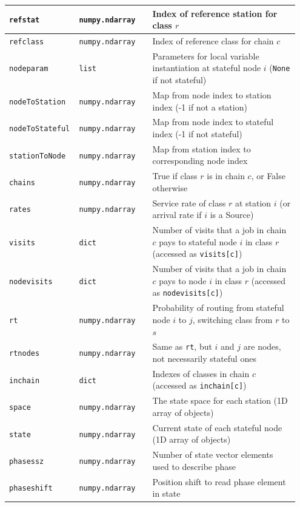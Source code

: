 \begin{PYTHON}
{\begin{longtable}{|p{0.20\linewidth}|p{0.25\linewidth}|p{0.50\linewidth}|}
\texttt{refstat} & \texttt{numpy.ndarray} & Index of reference station for class $r$\\\hline
\texttt{refclass} & \texttt{numpy.ndarray} & Index of reference class for chain $c$\\\hline
\texttt{nodeparam} & \texttt{list} & Parameters for local variable instantiation at stateful node $i$ (\texttt{None} if not stateful)\\\hline
\texttt{nodeToStation} & \texttt{numpy.ndarray} & Map from node index to station index (-1 if not a station)\\\hline
\texttt{nodeToStateful} & \texttt{numpy.ndarray} & Map from node index to stateful index (-1 if not stateful)\\\hline
\texttt{stationToNode} & \texttt{numpy.ndarray} & Map from station index to corresponding node index\\\hline
\texttt{chains} & \texttt{numpy.ndarray} & True if class $r$ is in chain $c$, or False otherwise\\\hline
\texttt{rates} & \texttt{numpy.ndarray} & Service rate of class $r$ at station $i$ (or arrival rate if $i$ is a Source)\\\hline
\texttt{visits} & \texttt{dict} & Number of visits that a job in chain $c$ pays to stateful node $i$ in class $r$ (accessed as \texttt{visits[c]})\\\hline
\texttt{nodevisits} & \texttt{dict} & Number of visits that a job in chain $c$ pays to node $i$ in class $r$ (accessed as \texttt{nodevisits[c]})\\\hline
\texttt{rt} & \texttt{numpy.ndarray} & Probability of routing from stateful node $i$ to $j$, switching class from $r$ to $s$\\\hline
\texttt{rtnodes} & \texttt{numpy.ndarray} & Same as \texttt{rt}, but $i$ and $j$ are nodes, not necessarily stateful ones\\\hline
\texttt{inchain} & \texttt{dict} & Indexes of classes in chain $c$ (accessed as \texttt{inchain[c]})\\\hline
\texttt{space} & \texttt{numpy.ndarray} & The state space for each station (1D array of objects)\\\hline
\texttt{state} & \texttt{numpy.ndarray} & Current state of each stateful node (1D array of objects)\\\hline
\texttt{phasessz} & \texttt{numpy.ndarray} & Number of state vector elements used to describe phase\\\hline
\texttt{phaseshift} & \texttt{numpy.ndarray} & Position shift to read phase element in state\\\hline

\end{longtable}}
\end{PYTHON}
